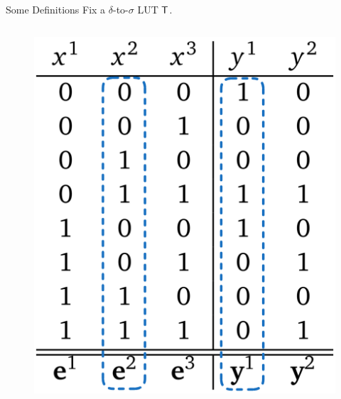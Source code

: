 \documentclass[../240906_cryptlab_flute.tex]{subfiles}
\begin{document}
\begin{frame}{Some Definitions}
    Fix a \(\delta\)-to-\(\sigma\) LUT \(\mathsf{T}\).
    \begin{columns}
        \begin{column}{.5\textwidth}
            \begin{figure}[H]
                \centering
                \includegraphics[width=.7\linewidth]{../images/example_table.png}
            \end{figure}

\end{column}
\end{columns}
\end{frame}
\end{document}
